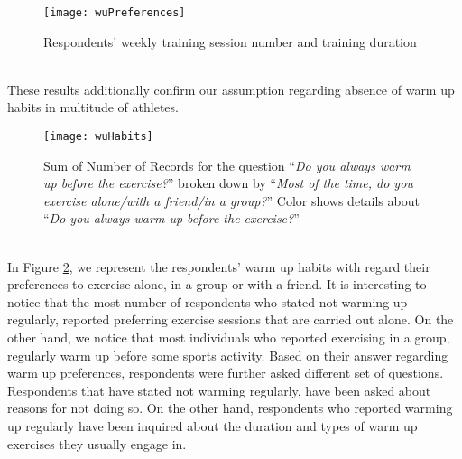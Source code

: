 \begin{figure}[h]
    \centering
    \texttt{[image: wuPreferences]}
    \caption{Respondents' weekly training session number and training duration}
    \label{fig:wuPreferences}
\end{figure}\\
These results additionally confirm our assumption regarding absence of warm up habits in multitude of athletes. \\
\begin{figure}[h]
    \centering
    \texttt{[image: wuHabits]}
    \caption{Sum of Number of Records for the question ``\textit{Do you always warm up before the exercise?}'' broken down by ``\textit{Most of the time, do you exercise alone/with a friend/in a group?}'' Color shows details about ``\textit{Do you always warm up before the exercise?}''}
    \label{fig:wuHabits}
\end{figure}\\
In Figure \ref{fig:wuHabits}, we represent the respondents' warm up habits with regard their preferences to exercise alone, in a group or with a friend. It is interesting to notice that the most number of respondents who stated not warming up regularly, reported preferring exercise sessions that are carried out alone. On the other hand, we notice that most individuals who reported exercising in a group, regularly warm up before some sports activity. Based on their answer regarding warm up preferences, respondents were further asked different set of questions. Respondents that have stated not warming regularly, have been asked about reasons for not doing so. On the other hand, respondents who reported warming up regularly have been inquired about the duration and types of warm up exercises they usually engage in.
